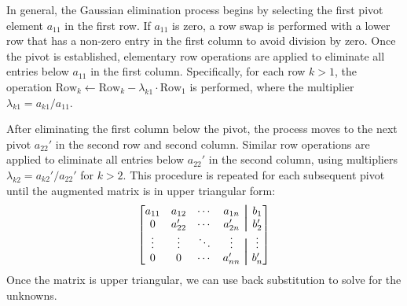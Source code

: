 In general, the Gaussian elimination process begins by selecting the first pivot element $ a_{11} $ in the first row. If $ a_{11} $ is zero, a row swap is performed with a lower row that has a non-zero entry in the first column to avoid division by zero. Once the pivot is established, elementary row operations are applied to eliminate all entries below $ a_{11} $ in the first column. Specifically, for each row $ k > 1 $, the operation $ \text{Row}_k \leftarrow \text{Row}_k - \lambda_{k1} \cdot \text{Row}_1 $ is performed, where the multiplier $ \lambda_{k1} = a_{k1}/a_{11} $.

After eliminating the first column below the pivot, the process moves to the next pivot $ a_{22}' $ in the second row and second column. Similar row operations are applied to eliminate all entries below $ a_{22}' $ in the second column, using multipliers $ \lambda_{k2} = a_{k2}'/a_{22}' $ for $ k > 2 $. This procedure is repeated for each subsequent pivot until the augmented matrix is in upper triangular form:
\begin{equation*}
    \begin{bmatrix}
        a_{11} & a_{12} & \cdots & a_{1n} & \aug & b_1 \\
        0 & a_{22}' & \cdots & a_{2n}' & \aug & b_2' \\
        \vdots & \vdots & \ddots & \vdots & \aug & \vdots \\
        0 & 0 & \cdots & a_{nn}' & \aug & b_n' \\
    \end{bmatrix}
\end{equation*}
Once the matrix is upper triangular, we can use back substitution to solve for the unknowns.

